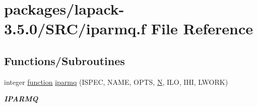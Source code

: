 \hypertarget{iparmq_8f}{}\section{packages/lapack-\/3.5.0/\+S\+R\+C/iparmq.f File Reference}
\label{iparmq_8f}
\subsection*{Functions/\+Subroutines}
\begin{DoxyCompactItemize}
\item 
integer \hyperlink{afunc_8m_a7b5e596df91eadea6c537c0825e894a7}{function} \hyperlink{group__auxOTHERauxiliary_ga6e703cb600283f4bcb1b340cfd8ad3d9}{iparmq} (I\+S\+P\+E\+C, N\+A\+M\+E, O\+P\+T\+S, \hyperlink{polmisc_8c_a0240ac851181b84ac374872dc5434ee4}{N}, I\+L\+O, I\+H\+I, L\+W\+O\+R\+K)
\begin{DoxyCompactList}\small\item\em {\bfseries I\+P\+A\+R\+M\+Q} \end{DoxyCompactList}\end{DoxyCompactItemize}
